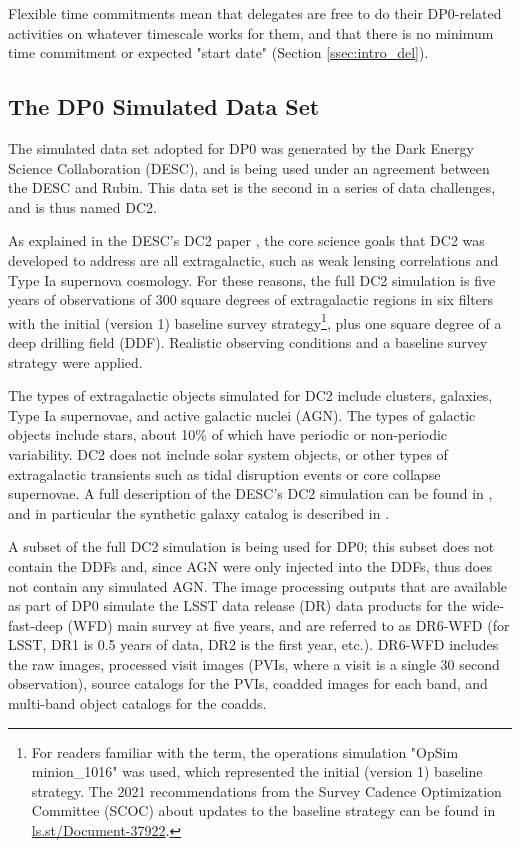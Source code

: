 \documentclass[DM,lsstdraft,authoryear,toc]{lsstdoc}
\begin{document}
Flexible time commitments mean that delegates are free to do their DP0-related activities on whatever timescale works for them, and that there is no minimum time commitment or expected "start date" (Section \ref{ssec:intro_del}).


\subsection{The DP0 Simulated Data Set}\label{ssec:intro_dc2}

The simulated data set adopted for DP0 was generated by the Dark Energy Science Collaboration (DESC), and is being used under an agreement between the DESC and Rubin.
This data set is the second in a series of data challenges, and is thus named DC2.

As explained in the DESC's DC2 paper \citep{2020arXiv201005926L}, the core science goals that DC2 was developed to address are all extragalactic, such as weak lensing correlations and Type Ia supernova cosmology.
For these reasons, the full DC2 simulation is five years of observations of 300 square degrees of extragalactic regions in six filters with the initial (version 1) baseline survey strategy\footnote{For readers familiar with the term, the operations simulation "OpSim minion\_1016" was used, which represented the initial (version 1) baseline strategy. The 2021 recommendations from the Survey Cadence Optimization Committee (SCOC) about updates to the baseline strategy can be found in \url{ls.st/Document-37922}.}, plus one square degree of a deep drilling field (DDF).
Realistic observing conditions and a baseline survey strategy were applied.

The types of extragalactic objects simulated for DC2 include clusters, galaxies, Type Ia supernovae, and active galactic nuclei (AGN).
The types of galactic objects include stars, about 10\% of which have periodic or non-periodic variability.
DC2 does not include solar system objects, or other types of extragalactic transients such as tidal disruption events or core collapse supernovae.
A full description of the DESC's DC2 simulation can be found in \citep{2020arXiv201005926L}, and in particular the synthetic galaxy catalog is described in \citet{2019ApJS..245...26K}.

A subset of the full DC2 simulation is being used for DP0; this subset does not contain the DDFs and, since AGN were only injected into the DDFs, thus does not contain any simulated AGN.
The image processing outputs that are available as part of DP0 simulate the LSST data release (DR) data products for the wide-fast-deep (WFD) main survey at five years, and are referred to as DR6-WFD (for LSST, DR1 is 0.5 years of data, DR2 is the first year, etc.).
DR6-WFD includes the raw images, processed visit images (PVIs, where a visit is a single 30 second observation), source catalogs for the PVIs, coadded images for each band, and multi-band object catalogs for the coadds.
\end{document}
